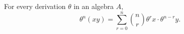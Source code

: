 For every derivation $\theta$ in an algebra $A$,
$$
\theta^n(xy) = \sum_{r=0}^{n} \binom{n}{r} \theta^r x \cdot \theta^{n-r} y.
$$
